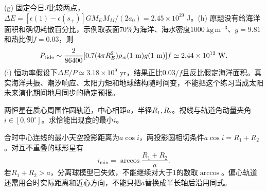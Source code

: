 \begin{solution}
(g) 固定今日$J$比较两点，$\Delta E=[\epsilon(1)-\epsilon(s_+)]GM_EM_M/(2a_0)=2.45\times10^{29}$ J。(h) 原题没有给海洋面积和确切耗散百分比，示例取表面70\%为海洋、海水密度$1000\ \mathrm{kg\,m^{-3}}$、$g=9.81$和热比例$f=0.03$，则
\[
 P_{\rm tide}\sim\frac2{86400}
 [0.7(4\pi R_E^2)\rho_w(1\ \mathrm m)g(1\ \mathrm m)]f
 \simeq2.44\times10^{12}\ \mathrm W.
\]
(i) 恒功率假设下$\Delta E/P\simeq3.18\times10^9$ yr，结果正比$0.03/f$且反比假定海洋面积。真实海洋共振、潮汐响应、太阳力矩和地球结构随时间变，不能把这个练习当成太阳未来演化期间地月同步的确定预报。
\end{solution}

\begin{exercise}
两恒星在质心周围作圆轨道，中心相距$a$，半径$R_1,R_2$。视线与轨道角动量夹角$i\in[0,90^\circ]$。求恰能出现食的最小$i$。
\end{exercise}
\begin{solution}
合时中心连线的最小天空投影距离为$a\cos i$，两投影圆相切条件$a\cos i=R_1+R_2$。对互不重叠的球形星有
\[
 i_{\min}=\arccos\frac{R_1+R_2}{a}.
\]
若$R_1+R_2>a$，分离球模型已失效，不能继续对大于1的数取$\arccos$。偏心轨道还需用合时实际距离和近心方向，不能只把$a$替换成半长轴后沿用同式。
\end{solution}

